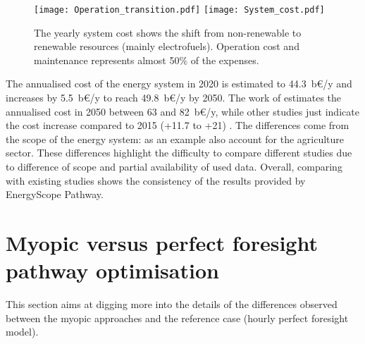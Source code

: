 \begin{figure}[!htbp] %
\centering
\texttt{[image: Operation\_transition.pdf]}
\texttt{[image: System\_cost.pdf]}
\caption{The yearly system cost shows the shift from non-renewable to renewable resources (mainly electrofuels). Operation cost and maintenance represents almost 50\% of the expenses.}
\label{fig:pestd_cumul_op}
\end{figure}

The annualised cost of the energy system in 2020 is estimated to 44.3~b€/y and increases by 5.5~b€/y to reach 49.8~b€/y by 2050. The work of \citet{My2050} estimates the annualised cost in 2050 between 63 and 82~b€/y, while other studies just indicate the cost increase compared to 2015 (+11.7 to +21) \citep{Devogelaer2013,PATHS2050}. The differences come from the scope of the energy system: as an example \citet{My2050} also account for the agriculture sector. These differences highlight the difficulty to compare different studies due to difference of scope and partial availability of used data. Overall, comparing with existing studies shows the consistency of the results provided by EnergyScope Pathway.

\section{Myopic versus perfect foresight pathway optimisation}
\label{app:my_vs_pf}
This section aims at digging more into the details of the differences observed between the myopic approaches and the reference case (\ie hourly perfect foresight model).

